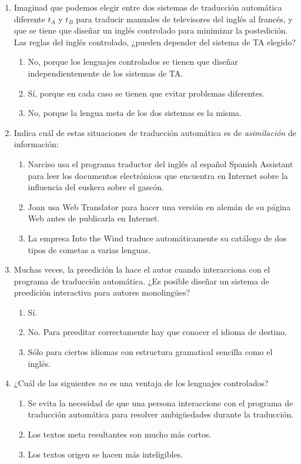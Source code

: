 \begin{enumerate}
\item Imaginad que podemos elegir entre dos sistemas de traducción automática diferente $t_A$ y $t_B$ para traducir manuales de televisores del inglés al francés, y que se tiene que diseñar un inglés controlado para minimizar la postedición. Las reglas del inglés controlado, ¿pueden depender del sistema de TA elegido? \begin{enumerate} \item No, porque los lenguajes controlados se tienen que diseñar independientemente de los sistemas de TA. \item Sí, porque en cada caso se tienen que evitar problemas diferentes. \item No, porque la lengua meta de los dos sistemas es la misma. \end{enumerate} 

\item Indica cuál de estas situaciones de traducción automática es de \emph{asimilación} de información: \begin{enumerate} \item Narciso usa el programa traductor del inglés al español Spanish Assistant para leer los documentos electrónicos que encuentra en Internet sobre la influencia del euskera sobre el gascón. \item Joan usa Web Translator para hacer una versión en alemán de su página Web antes de publicarla en Internet. \item La empresa Into the Wind traduce automáticamente su catálogo de dos tipos de cometas a varias lenguas. \end{enumerate} 

\item Muchas veces, la preedición la hace el autor cuando interacciona con el programa de traducción automática. ¿Es posible diseñar un sistema de preedición interactiva para autores monolingües? \begin{enumerate} \item Sí. \item No. Para preeditar correctamente hay que conocer el idioma de destino. \item Sólo para ciertos idiomas con estructura gramatical sencilla como el inglés. \end{enumerate} 

\item ¿Cuál de las siguientes \emph{no} es una ventaja de los lenguajes controlados? \begin{enumerate} \item Se evita la necesidad de que una persona interaccione con el programa de traducción automática para resolver ambigüedades durante la traducción. \item Los textos meta resultantes son mucho más cortos. \item Los textos origen se hacen más inteligibles. \end{enumerate} 


\end{enumerate}
